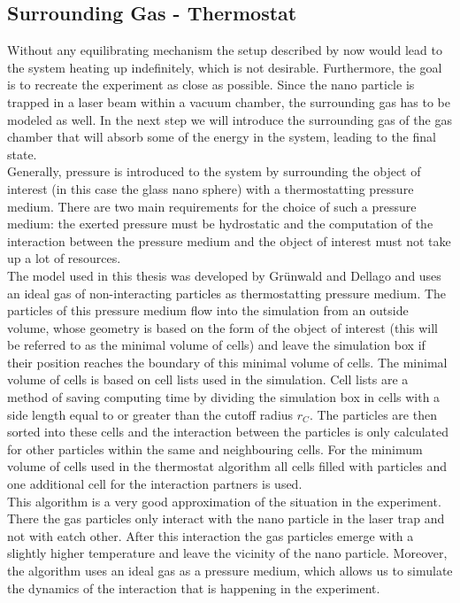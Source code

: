\documentclass[12pt]{article}
\begin{document}
\subsection{Surrounding Gas - Thermostat}
Without any equilibrating mechanism the setup described by now would lead to the system heating up indefinitely, which is not desirable. Furthermore,
the goal is to recreate the experiment as close as possible. Since the nano particle is trapped in a laser beam within a vacuum chamber, the
surrounding gas has to be modeled as well. In the next step we will introduce the surrounding gas of the gas chamber that will absorb some of the 
energy in the system, leading to the final state.\\
Generally, pressure is introduced to the system by surrounding the object of interest (in this case the glass nano sphere) with a thermostatting
pressure medium.
There are two main requirements for the choice of such a pressure medium: the exerted pressure must be hydrostatic and the computation of the
interaction between the pressure medium and the object of interest must not take up a lot of resources.\\
The model used in this thesis was developed by Gr\"unwald and Dellago \cite{Gruenwald2006} and uses an ideal gas of non-interacting particles as
thermostatting pressure medium. The particles of this pressure medium flow into the simulation from an outside volume, whose geometry is based on the form of the
object of interest (this will be referred to as the minimal volume of cells) and leave the simulation box if their position reaches the boundary of
this minimal volume of cells. The minimal volume of cells is based on cell lists used in the simulation. Cell lists are a method of saving 
computing time by dividing the simulation box in cells with a side length equal to or greater than the cutoff radius $r_C$. The particles are then
sorted into these cells and the interaction between the particles is only calculated for other particles within the same and neighbouring cells. 
For the minimum volume of cells used in the thermostat algorithm all cells filled with particles and one additional cell for the interaction partners
is used.\\
This algorithm is a very good approximation of the situation in the experiment.  There the gas particles only interact with the nano 
particle in the laser trap and not with eatch other. After this interaction the
gas particles emerge with a slightly higher temperature and leave the vicinity of the nano particle. Moreover, the algorithm uses an ideal gas
as a pressure medium, which allows us to simulate the dynamics of the interaction that is happening in the experiment.\\
\end{document}
